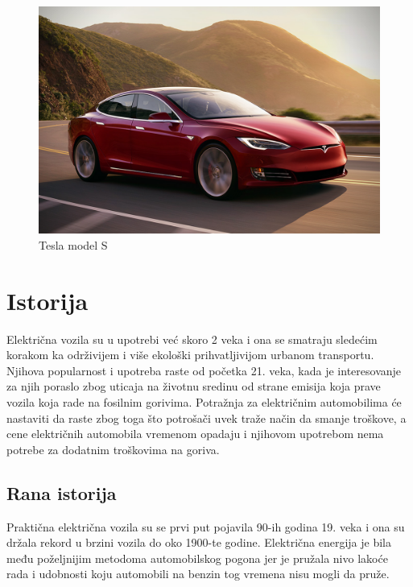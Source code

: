 \documentclass[a4paper]{article}
\begin{document}
\begin{figure}[h]
        \centering
        \includegraphics[width=\linewidth]{tesla.jpeg}
        \caption{Tesla model S}
        \label{fig:IMG_Tesla}
        \end{figure}
    
         
\label{sec:uvod}












\section{Istorija}
\label{sec:naslov1}


Električna vozila su u upotrebi već skoro 2 veka i ona se smatraju sledećim korakom ka održivijem i više ekološki prihvatljivijom urbanom transportu. Njihova popularnost i upotreba raste od početka 21. veka, kada je interesovanje za njih poraslo zbog uticaja na životnu sredinu od strane emisija koja prave vozila koja rade na fosilnim gorivima. Potražnja za električnim automobilima će nastaviti da raste zbog toga što potrošači uvek traže način da smanje troškove, a cene električnih automobila vremenom opadaju i njihovom upotrebom nema potrebe za dodatnim troškovima na goriva.


\subsection{Rana istorija}
\label{subsec:podnaslov1}

Praktična električna vozila su se prvi put pojavila 90-ih godina 19. veka i ona su držala rekord u brzini vozila do oko 1900-te godine. Električna energija je bila među poželjnijim metodoma automobilskog pogona jer je pružala nivo lakoće rada i udobnosti koju automobili na benzin tog vremena nisu mogli da pruže.
\end{document}
